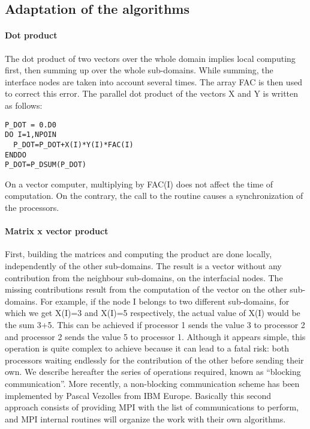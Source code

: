 \subsection{Adaptation of the algorithms}

\paragraph{Dot product}

The dot product of two vectors over the whole domain implies local computing
first, then summing up over the whole sub-domains. While summing, the interface
nodes are taken into account several times. The array FAC is then used to
correct this error. The parallel dot product  of the vectors X
and Y is written as follows:

\begin{lstlisting}[language=TelFortran]
P_DOT = 0.D0
DO I=1,NPOIN
  P_DOT=P_DOT+X(I)*Y(I)*FAC(I)
ENDDO
P_DOT=P_DSUM(P_DOT)
\end{lstlisting}

On a vector computer, multiplying by FAC(I) does not affect the time of
computation. On the contrary, the call to the  routine causes a
synchronization of the processors.

\paragraph{Matrix x vector product}

First, building the matrices and computing the product are done locally,
independently of the other sub-domains. The result is a vector without any
contribution from the neighbour sub-domains, on the interfacial nodes. The
missing contributions result from the computation of the vector on the other
sub-domains. For example, if the node I belongs to two different sub-domains,
for which we get X(I)=3 and X(I)=5 respectively, the actual value of X(I) would
be the sum 3+5. This can be achieved if processor 1 sends the value 3 to
processor 2 and processor 2 sends the value 5 to processor 1. Although it
appears simple, this operation is quite complex to achieve because it can lead
to a fatal risk: both processors waiting endlessly for the contribution of the
other before sending their own. We describe hereafter the series of operations
required, known as ``blocking communication''. More recently, a non-blocking
communication scheme has been implemented by Pascal Vezolles from IBM Europe.
Basically this second approach consists of providing MPI with the list of
communications to perform, and MPI internal routines will organize the work
with their own algorithms.

